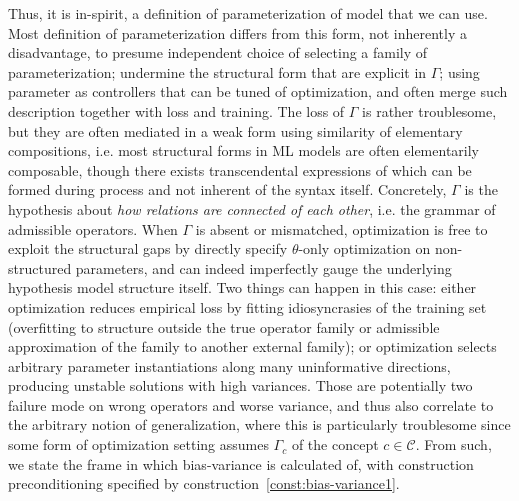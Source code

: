 Thus, it is in-spirit, a definition of parameterization of model that we can use. Most definition of parameterization differs from this form, not inherently a disadvantage, to presume independent choice of selecting a family of parameterization; undermine the structural form that are explicit in $\Gamma$; using parameter as controllers that can be tuned of optimization, and often merge such description together with loss and training. The loss of $\Gamma$ is rather troublesome, but they are often mediated in a weak form using similarity of elementary compositions, i.e. most structural forms in ML models are often elementarily composable, though there exists transcendental expressions of which can be formed during process and not inherent of the syntax itself. Concretely, $\Gamma$ is the hypothesis about \textit{how relations are connected of each other}, i.e. the grammar of admissible operators. When $\Gamma$ is absent or mismatched, optimization is free to exploit the structural gaps by directly specify $\theta$-only optimization on non-structured parameters, and can indeed imperfectly gauge the underlying hypothesis model structure itself. Two things can happen in this case: either optimization reduces empirical loss by fitting idiosyncrasies of the training set (overfitting to structure outside the true operator family or admissible approximation of the family to another external family); or optimization selects arbitrary parameter instantiations along many uninformative directions, producing unstable solutions with high variances. Those are potentially two failure mode on wrong operators and worse variance, and thus also correlate to the arbitrary notion of generalization, where this is particularly troublesome since some form of optimization setting assumes $\Gamma_{c}$ of the concept $c\in\mathcal{C}$. From such, we state the frame in which bias-variance is calculated of, with construction preconditioning specified by construction~\ref{const:bias-variance1}. 


